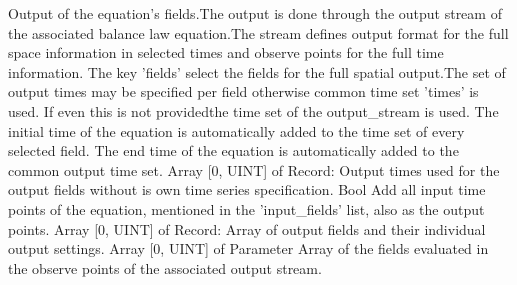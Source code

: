 \begin{RecordType}
	{}
	{} %
	{} %
	{} %
	{{{Output of the equation's fields.The output is done through the output stream of the associated balance law equation.The stream defines output format for the full space information in selected times and observe points for the full time information. The key 'fields' select the fields for the full spatial output.The set of output times may be specified  per field otherwise common time set 'times' is used. If even this is not providedthe time set of the output{\_}stream is used. The initial time of the equation is automatically added to the time set of every selected field. The end time of the equation is automatically added to the common output time set.}}}
		\KeyItem
			{}
			{{Array [0, UINT] of }{Record}{: }}
			{\textrangle}
			{} %
			{{{Output times used for the output fields without is own time series specification.}}}
		\KeyItem
			{}
			{{Bool}}
			{\textrangle}
			{} %
			{{{Add all input time points of the equation, mentioned in the 'input{\_}fields' list, also as the output points.}}}
		\KeyItem
			{}
			{{Array [0, UINT] of }{Record}{: }}
			{\textlangle{ \it{[]} }\textrangle}
			{} %
			{{{Array of output fields and their individual output settings.}}}
		\KeyItem
			{}
			{{Array [0, UINT] of }{Parameter}}
			{\textlangle{ \it{[]} }\textrangle}
			{} %
			{{{Array of the fields evaluated in the observe points of the associated output stream.}}}
\end{RecordType}
